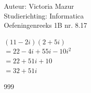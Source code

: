 \documentclass[a4paper]{article}
\begin{document}
  
\noindent \large Auteur: Victoria Mazur \\
\noindent \large Studierichting: Informatica\\
\noindent \large Oefeningenreeks 1B nr. 8.17\\

\medskip

\normalsize

$ (11 - 2i)(2 + 5i)$ \\

$= 22 - 4i + 55i - 10i^2$ \\

$= 22 + 51i + 10$ \\

$= 32 + 51i $
 
\begin{thebibliography}{999}
\end{thebibliography}
\end{document}
